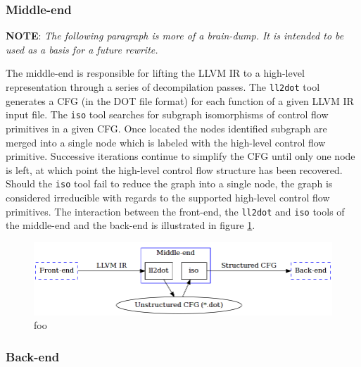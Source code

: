\subsubsection{Middle-end}



\textbf{NOTE}: \textit{The following paragraph is more of a brain-dump. It is intended to be used as a basis for a future rewrite.}

The middle-end is responsible for lifting the LLVM IR to a high-level representation through a series of decompilation passes. The \texttt{ll2dot} tool generates a CFG (in the DOT file format) for each function of a given LLVM IR input file. The \texttt{iso} tool searches for subgraph isomorphisms of control flow primitives in a given CFG. Once located the nodes identified subgraph are merged into a single node which is labeled with the high-level control flow primitive. Successive iterations continue to simplify the CFG until only one node is left, at which point the high-level control flow structure has been recovered. Should the \texttt{iso} tool fail to reduce the graph into a single node, the graph is considered irreducible with regards to the supported high-level control flow primitives. The interaction between the front-end, the \texttt{ll2dot} and \texttt{iso} tools of the middle-end and the back-end is illustrated in figure \ref{fig:middle-end}.

\begin{figure}[htbp]
	\begin{center}
		\includegraphics[width=\textwidth]{inc/middle-end.png}
		\caption{foo}
		\label{fig:middle-end}
	\end{center}
\end{figure}

\subsubsection{Back-end}


